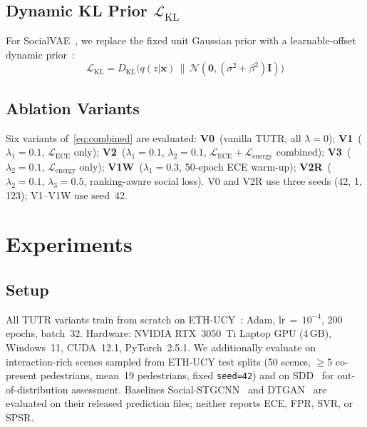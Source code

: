 \documentclass[journal]{IEEEtran}
\begin{document}
\subsection{Dynamic KL Prior \texorpdfstring{$\mathcal{L}_{\text{KL}}$}{L\_KL}}

For SocialVAE~\cite{xu2022socialvae}, we replace the fixed unit
Gaussian prior with a learnable-offset dynamic
prior~\cite{zhang2025openworld}:
\begin{equation}
  \mathcal{L}_{\text{KL}} =
  D_{\mathrm{KL}}\!\bigl(q(z|\mathbf{x})\,\|\,
  \mathcal{N}(\mathbf{0},(\sigma^2+\beta^2)\mathbf{I})\bigr)
  \label{eq:lkl}
\end{equation}

\subsection{Ablation Variants}

Six variants of~\eqref{eq:combined} are evaluated:
\textbf{V0}~(vanilla TUTR, all $\lambda{=}0$);
\textbf{V1}~($\lambda_1{=}0.1$, $\mathcal{L}_{\text{ECE}}$ only);
\textbf{V2}~($\lambda_1{=}0.1$, $\lambda_2{=}0.1$,
$\mathcal{L}_{\text{ECE}}+\mathcal{L}_{\text{energy}}$ combined);
\textbf{V3}~($\lambda_2{=}0.1$, $\mathcal{L}_{\text{energy}}$ only);
\textbf{V1W}~($\lambda_1{=}0.3$, 50-epoch ECE warm-up);
\textbf{V2R}~($\lambda_2{=}0.1$, $\lambda_3{=}0.5$,
ranking-aware social loss).
V0 and V2R use three seeds (42, 1, 123); V1--V1W use seed~42.

\section{Experiments}
\label{sec:experiments}

\subsection{Setup}

All TUTR variants train from scratch on ETH-UCY~\cite{pellegrini2009eth,
lerner2007ucy}: Adam, lr\,\(=\,10^{-4}\), 200 epochs, batch~32.
Hardware: NVIDIA RTX~3050~Ti Laptop GPU (4\,GB), Windows~11,
CUDA~12.1, PyTorch~2.5.1.
We additionally evaluate on interaction-rich scenes sampled from
ETH-UCY test splits (50 scenes, \(\geq5\) co-present pedestrians,
mean~19 pedestrians, fixed \texttt{seed=42}) and on
SDD~\cite{mangalam2020pecnet} for out-of-distribution assessment.
Baselines Social-STGCNN~\cite{mohamed2020social} and
DTGAN~\cite{xie2024dtgan} are evaluated on their released prediction
files; neither reports ECE, FPR, SVR, or SPSR.
\end{document}
